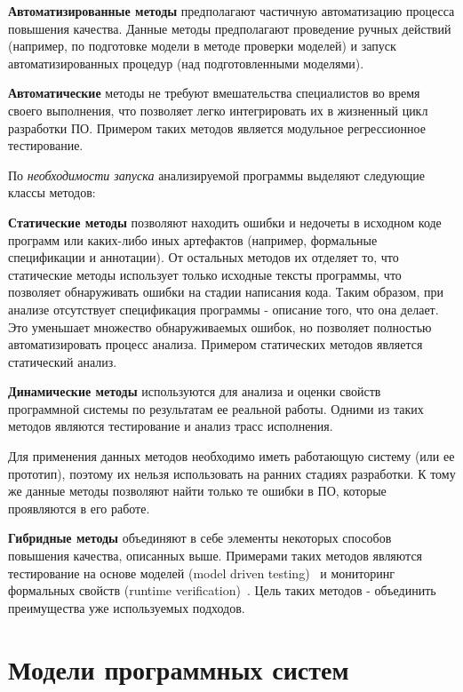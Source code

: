\textbf{Автоматизированные методы} предполагают частичную автоматизацию процесса
повышения качества. Данные методы предполагают проведение ручных действий
(например, по подготовке модели в методе проверки моделей) и запуск
автоматизированных процедур (над подготовленными моделями).

\textbf{Автоматические} методы не требуют вмешательства специалистов во время
своего выполнения, что позволяет легко интегрировать их в жизненный цикл
разработки ПО. Примером таких методов является модульное регрессионное
тестирование.

По \emph{необходимости запуска} анализируемой программы выделяют следующие
классы методов:

\textbf{Статические методы} позволяют находить ошибки и недочеты в
исходном коде программ или каких-либо иных артефактов (например, формальные
спецификации и аннотации). От остальных методов их отделяет то, что статические
методы использует только исходные тексты программы, что позволяет обнаруживать
ошибки на стадии написания кода. Таким образом, при анализе отсутствует
спецификация программы - описание того, что она делает. Это уменьшает множество
обнаруживаемых ошибок, но позволяет полностью автоматизировать процесс анализа.
Примером статических методов является статический анализ.

\textbf{Динамические методы} используются для анализа и оценки свойств
программной системы по результатам ее реальной работы. Одними из таких методов
являются тестирование и анализ трасс исполнения.

Для применения данных методов необходимо иметь работающую систему (или ее
прототип), поэтому их нельзя использовать на ранних стадиях разработки. К тому
же данные методы позволяют найти только те ошибки в ПО, которые проявляются в
его работе.

\textbf{Гибридные методы} объединяют в себе элементы некоторых способов
повышения качества, описанных выше. Примерами таких методов являются
тестирование на основе моделей (model driven testing)~\cite{Vieira2006} и
мониторинг формальных свойств (runtime
verification)~\cite{runtime_verification}. Цель таких методов - объединить
преимущества уже используемых подходов.

\section{Модели программных систем}
\label{sec:system_models}


